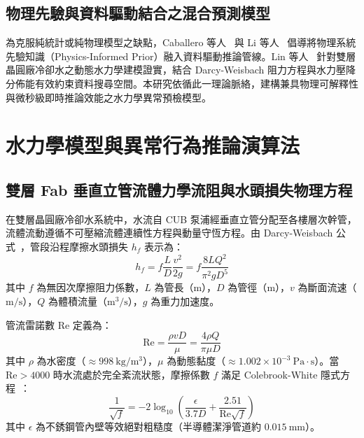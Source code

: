 \documentclass[fontset=none, a4paper, 12pt]{ctexart}
\begin{document}
\begin{doublespace}
\subsection{物理先驗與資料驅動結合之混合預測模型}
為克服純統計或純物理模型之缺點，Caballero 等人~\cite{caballero2026predictive} 與 Li 等人~\cite{li2024prognostics} 倡導將物理系統先驗知識（Physics-Informed Prior）融入資料驅動推論管線。Lin 等人~\cite{lin2023hydraulic} 針對雙層晶圓廠冷卻水之動態水力學建模證實，結合 Darcy-Weisbach 阻力方程與水力壓降分佈能有效約束資料搜尋空間。本研究依循此一理論脈絡，建構兼具物理可解釋性與微秒級即時推論效能之水力學異常預檢模型。

\clearpage
\section{水力學模型與異常行為推論演算法}

\subsection{雙層 Fab 垂直立管流體力學流阻與水頭損失物理方程}
在雙層晶圓廠冷卻水系統中，水流自 CUB 泵浦經垂直立管分配至各樓層次幹管，流體流動遵循不可壓縮流體連續性方程與動量守恆方程。由 Darcy-Weisbach 公式~\cite{darcy1857recherches}，管段沿程摩擦水頭損失 $h_f$ 表示為：
\begin{equation}
h_f = f \frac{L}{D} \frac{v^2}{2g} = f \frac{8 L Q^2}{\pi^2 g D^5}
\label{eq:darcy}
\end{equation}
其中 $f$ 為無因次摩擦阻力係數，$L$ 為管長（$\mathrm{m}$），$D$ 為管徑（$\mathrm{m}$），$v$ 為斷面流速（$\mathrm{m/s}$），$Q$ 為體積流量（$\mathrm{m^3/s}$），$g$ 為重力加速度。

管流雷諾數 $\mathrm{Re}$ 定義為：
\begin{equation}
\mathrm{Re} = \frac{\rho v D}{\mu} = \frac{4 \rho Q}{\pi \mu D}
\label{eq:reynolds}
\end{equation}
其中 $\rho$ 為水密度（$\approx 998\ \mathrm{kg/m^3}$），$\mu$ 為動態黏度（$\approx 1.002 \times 10^{-3}\ \mathrm{Pa\cdot s}$）。當 $\mathrm{Re} > 4000$ 時水流處於完全紊流狀態，摩擦係數 $f$ 滿足 Colebrook-White 隱式方程~\cite{colebrook1939turbulent}：
\begin{equation}
\frac{1}{\sqrt{f}} = -2 \log_{10} \left( \frac{\epsilon}{3.7 D} + \frac{2.51}{\mathrm{Re} \sqrt{f}} \right)
\label{eq:colebrook}
\end{equation}
其中 $\epsilon$ 為不銹鋼管內壁等效絕對粗糙度（半導體潔淨管道約 $0.015\ \mathrm{mm}$）。


\end{doublespace}
\end{document}
